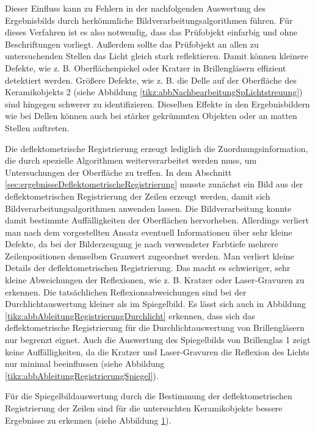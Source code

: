 \noindent
Dieser Einfluss kann zu Fehlern in der nachfolgenden Auswertung des Ergebnisbilds durch herkömmliche Bildverarbeitungsalgorithmen führen.
Für dieses Verfahren ist es also notwendig, dass das Prüfobjekt einfarbig und ohne Beschriftungen vorliegt.
Außerdem sollte das Prüfobjekt an allen zu untersuchenden Stellen das Licht gleich stark reflektieren.
Damit können kleinere Defekte, wie z. B. Oberflächenpickel oder Kratzer in Brillengläsern effizient detektiert werden.
Größere Defekte, wie z. B. die Delle auf der Oberfläche des Keramikobjekts 2 (siehe Abbildung \ref{tikz:abbNachbearbeitungSpLichtstreuung}) sind hingegen schwerer zu identifizieren.
Dieselben Effekte in den Ergebnisbildern wie bei Dellen können auch bei stärker gekrümmten Objekten oder an matten Stellen auftreten.

\p
Die deflektometrische Registrierung erzeugt lediglich die Zuordnungsinformation, die durch spezielle Algorithmen weiterverarbeitet werden muss, um Untersuchungen der Oberfläche zu treffen.
In dem Abschnitt \ref{sec:ergebnisseDeflektometrischeRegistrierung} musste zunächst ein Bild aus der deflektometrischen Registrierung der Zeilen erzeugt werden, damit sich Bildverarbeitungsalgorithmen anwenden lassen.
Die Bildverarbeitung konnte damit bestimmte Auffälligkeiten der Oberflächen hervorheben.
Allerdings verliert man nach dem vorgestellten Ansatz eventuell Informationen über sehr kleine Defekte, da bei der Bilderzeugung je nach verwendeter Farbtiefe mehrere Zeilenpositionen demselben Grauwert zugeordnet werden.
Man verliert kleine Details der deflektometrischen Registrierung.
Das macht es schwieriger, sehr kleine Abweichungen der Reflexionen, wie z. B. Kratzer oder Laser-Gravuren zu erkennen.
Die tatsächlichen Reflexionsabweichungen sind bei der Durchlichtauswertung kleiner als im Spiegelbild.
Es lässt sich auch in Abbildung \ref{tikz:abbAbleitungRegistrierungDurchlicht} erkennen, dass sich das deflektometrische Registrierung für die Durchlichtauswertung von Brillengläsern nur begrenzt eignet.
Auch die Auswertung des Spiegelbilds von Brillenglas 1 zeigt keine Auffälligkeiten, da die Kratzer und Laser-Gravuren die Reflexion des Lichts nur minimal beeinflussen (siehe Abbildung \ref{tikz:abbAbleitungRegistrierungSpiegel}).

\p
Für die Spiegelbildauswertung durch die Bestimmung der deflektometrischen Registrierung der Zeilen sind für die untersuchten Keramikobjekte bessere Ergebnisse zu erkennen (siehe Abbildung \ref{tikz:abbErkennbareDefekteRegistrierung}).

{
	\begin{figure}[H]
		\centering
		
		\label{tikz:abbErkennbareDefekteRegistrierung}
	\end{figure}
}

